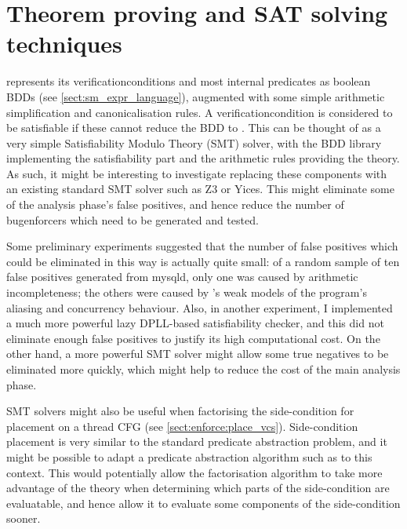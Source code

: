 \section{Theorem proving and SAT solving techniques}

{\Technique} represents its \glspl{verificationcondition} and most
internal predicates as boolean BDDs (see
\autoref{sect:sm_expr_language}), augmented with some simple
arithmetic simplification and canonicalisation rules.  A
\gls{verificationcondition} is considered to be satisfiable if these
cannot reduce the BDD to \false.  This can be thought of as a very
simple Satisfiability Modulo Theory (SMT) solver\cite{Barrett2009},
with the BDD library implementing the satisfiability part and the
arithmetic rules providing the theory.  As such, it might be
interesting to investigate replacing these components with an existing
standard SMT solver such as Z3\cite{Moura2008} or
Yices\cite{Dutertre2006}.  This might eliminate some of the analysis
phase's false positives, and hence reduce the number of
\glspl{bugenforcer} which need to be generated and tested.

Some preliminary experiments suggested that the number of false
positives which could be eliminated in this way is actually quite
small: of a random sample of ten false positives generated from
mysqld, only one was caused by arithmetic incompleteness; the others
were caused by {\technique}'s weak models of the program's aliasing
and concurrency behaviour.  Also, in another experiment, I implemented
a much more powerful lazy DPLL-based satisfiability
checker\cite{Davis1962}, and this did not eliminate enough false
positives to justify its high computational cost.  On the other hand,
a more powerful SMT solver might allow some true negatives to be
eliminated more quickly, which might help to reduce the cost of the
main analysis phase.

SMT solvers might also be useful when factorising the side-condition
for placement on a thread CFG (see \autoref{sect:enforce:place_vcs}).
Side-condition placement is very similar to the standard predicate
abstraction problem\cite{Graf1997}, and it might be possible to adapt
a predicate abstraction algorithm such as \cite{Lahiri2006} to this
context.  This would potentially allow the factorisation algorithm to
take more advantage of the theory when determining which parts of the
side-condition are evaluatable, and hence allow it to evaluate some
components of the side-condition sooner.



